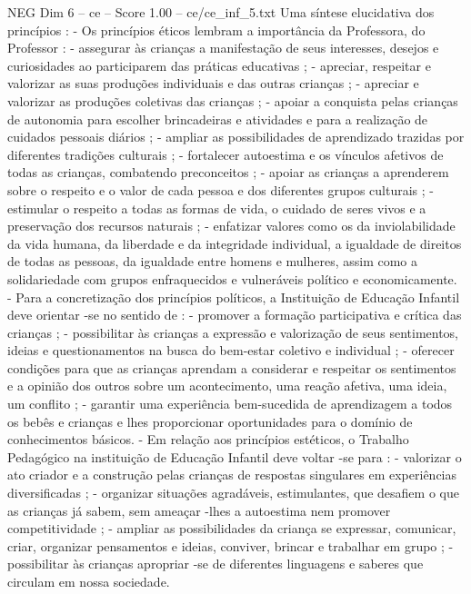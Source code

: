 \begin{textsample}{NEG Dim 6 – ce – Score 1.00 – ce/ce\_inf\_5.txt}
Uma síntese elucidativa dos princípios : - Os princípios éticos lembram a importância da Professora, do Professor : - assegurar às crianças a manifestação de seus interesses, desejos e curiosidades ao participarem das práticas educativas ; - apreciar, respeitar e valorizar as suas produções individuais e das outras crianças ; - apreciar e valorizar as produções coletivas das crianças ; - apoiar a conquista pelas crianças de autonomia para escolher brincadeiras e atividades e para a realização de cuidados pessoais diários ; - ampliar as possibilidades de aprendizado trazidas por diferentes tradições culturais ; - fortalecer autoestima e os vínculos afetivos de todas as crianças, combatendo preconceitos ; - apoiar as crianças a aprenderem sobre o respeito e o valor de cada pessoa e dos diferentes grupos culturais ; - estimular o respeito a todas as formas de vida, o cuidado de seres vivos e a preservação dos recursos naturais ; - enfatizar valores como os da inviolabilidade da vida humana, da liberdade e da integridade individual, a igualdade de direitos de todas as pessoas, da igualdade entre homens e mulheres, assim como a solidariedade com grupos enfraquecidos e vulneráveis político e economicamente. - Para a concretização dos princípios políticos, a Instituição de Educação Infantil deve orientar -se no sentido de : - promover a formação participativa e crítica das crianças ; - possibilitar às crianças a expressão e valorização de seus sentimentos, ideias e questionamentos na busca do bem-estar coletivo e individual ; - oferecer condições para que as crianças aprendam a considerar e respeitar os sentimentos e a opinião dos outros sobre um acontecimento, uma reação afetiva, uma ideia, um conflito ; - garantir uma experiência bem-sucedida de aprendizagem a todos os bebês e crianças e lhes proporcionar oportunidades para o domínio de conhecimentos básicos. - Em relação aos princípios estéticos, o Trabalho Pedagógico na instituição de Educação Infantil deve voltar -se para : - valorizar o ato criador e a construção pelas crianças de respostas singulares em experiências diversificadas ; - organizar situações agradáveis, estimulantes, que desafiem o que as crianças já sabem, sem ameaçar -lhes a autoestima nem promover competitividade ; - ampliar as possibilidades da criança se expressar, comunicar, criar, organizar pensamentos e ideias, conviver, brincar e trabalhar em grupo ; - possibilitar às crianças apropriar -se de diferentes linguagens e saberes que circulam em nossa sociedade.

\end{textsample}
